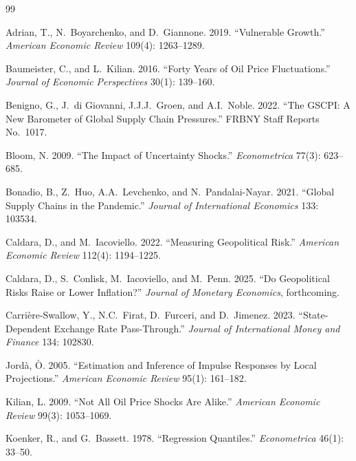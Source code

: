 \documentclass[12pt]{article}
\begin{document}
\newpage


\begin{thebibliography}{99}

Adrian, T., N.~Boyarchenko, and D.~Giannone. 2019.
``Vulnerable Growth.'' \textit{American Economic Review}
109(4): 1263--1289.

Baumeister, C., and L.~Kilian. 2016.
``Forty Years of Oil Price Fluctuations.''
\textit{Journal of Economic Perspectives} 30(1): 139--160.

Benigno, G., J.~di Giovanni, J.J.J.~Groen, and A.I.~Noble. 2022.
``The GSCPI: A New Barometer of Global Supply Chain Pressures.''
FRBNY Staff Reports No.\ 1017.

Bloom, N. 2009. ``The Impact of Uncertainty Shocks.''
\textit{Econometrica} 77(3): 623--685.

Bonadio, B., Z.~Huo, A.A.~Levchenko, and N.~Pandalai-Nayar. 2021.
``Global Supply Chains in the Pandemic.''
\textit{Journal of International Economics} 133: 103534.

Caldara, D., and M.~Iacoviello. 2022.
``Measuring Geopolitical Risk.''
\textit{American Economic Review} 112(4): 1194--1225.

Caldara, D., S.~Conlisk, M.~Iacoviello, and M.~Penn. 2025.
``Do Geopolitical Risks Raise or Lower Inflation?''
\textit{Journal of Monetary Economics}, forthcoming.

Carri\`{e}re-Swallow, Y., N.C.~Firat, D.~Furceri, and D.~Jimenez. 2023.
``State-Dependent Exchange Rate Pass-Through.''
\textit{Journal of International Money and Finance} 134: 102830.

Jord\`{a}, \`{O}. 2005.
``Estimation and Inference of Impulse Responses by Local Projections.''
\textit{American Economic Review} 95(1): 161--182.

Kilian, L. 2009.
``Not All Oil Price Shocks Are Alike.''
\textit{American Economic Review} 99(3): 1053--1069.

Koenker, R., and G.~Bassett. 1978.
``Regression Quantiles.'' \textit{Econometrica} 46(1): 33--50.


\end{thebibliography}
\end{document}
